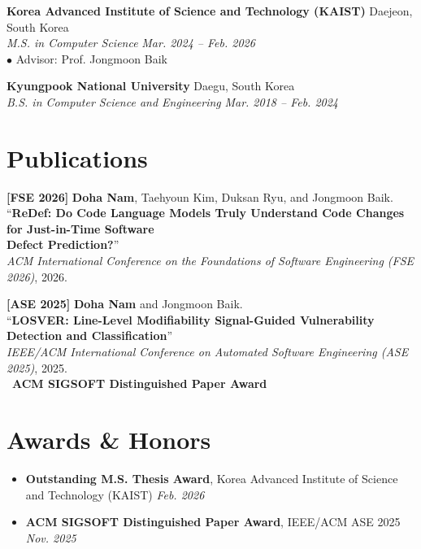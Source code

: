 \documentclass[10pt,letterpaper]{article}
\begin{document}
\vspace{0.6em}
\noindent
\textbf{Korea Advanced Institute of Science and Technology (KAIST)} \hfill Daejeon, South Korea\\
\textit{M.S. in Computer Science} \hfill \textit{Mar. 2024 -- Feb. 2026}\\
\null\quad $\bullet$ Advisor: Prof. Jongmoon Baik

\vspace{0.6em}
\noindent
\textbf{Kyungpook National University} \hfill Daegu, South Korea\\
\textit{B.S. in Computer Science and Engineering} \hfill \textit{Mar. 2018 -- Feb. 2024}

\section{Publications}
\vspace{0.2em}

\noindent
\textbf{[FSE 2026]} \textbf{Doha Nam}, Taehyoun Kim, Duksan Ryu, and Jongmoon Baik.\\
\null\quad ``\textbf{ReDef: Do Code Language Models Truly Understand Code Changes for Just-in-Time Software}\\
\null\quad \textbf{Defect Prediction?}''\\
\null\quad \textit{ACM International Conference on the Foundations of Software Engineering (FSE 2026)}, 2026.

\vspace{0.65em}
\noindent
\textbf{[ASE 2025]} \textbf{Doha Nam} and Jongmoon Baik.\\
\null\quad ``\textbf{LOSVER: Line-Level Modifiability Signal-Guided Vulnerability Detection and Classification}''\\
\null\quad \textit{IEEE/ACM International Conference on Automated Software Engineering (ASE 2025)}, 2025.\\
\null\quad \textcolor{accent}{\faTrophy\ \textbf{ACM SIGSOFT Distinguished Paper Award}}

\section{Awards \& Honors}
\begin{itemize}[itemsep=4pt, topsep=3pt]
    \item \textbf{Outstanding M.S. Thesis Award}, Korea Advanced Institute of Science and Technology (KAIST) \hfill \textit{Feb. 2026}
    \item \textbf{ACM SIGSOFT Distinguished Paper Award}, IEEE/ACM ASE 2025 \hfill \textit{Nov. 2025}
\end{itemize}
\end{document}
